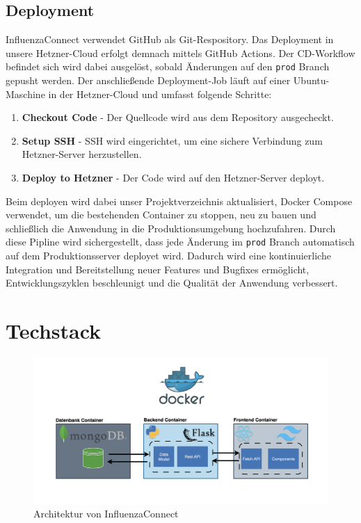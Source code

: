 \documentclass[conference,a4paper,flushend]{cs-techrep}
\begin{document}
\subsection{Deployment}
InfluenzaConnect verwendet GitHub als Git-Respository. Das Deployment in unsere Hetzner-Cloud erfolgt demnach mittels GitHub Actions. Der CD-Workflow befindet sich wird dabei ausgelöst, sobald Änderungen auf den \texttt{prod} Branch gepusht werden. Der anschließende Deployment-Job läuft auf einer Ubuntu-Maschine in der Hetzner-Cloud und umfasst folgende Schritte:
\begin{enumerate}
\item{\textbf{Checkout Code} - Der Quellcode wird aus dem Repository ausgecheckt.}
\item{\textbf{Setup SSH} - SSH wird eingerichtet, um eine sichere Verbindung zum Hetzner-Server
herzustellen.}
\item{\textbf{Deploy to Hetzner} - Der Code wird auf den Hetzner-Server deployt.}
\end{enumerate}
Beim deployen wird dabei unser Projektverzeichnis aktualisiert, Docker Compose verwendet, um die bestehenden Container zu stoppen, neu zu bauen und schließlich die Anwendung in die Produktionsumgebung hochzufahren.
Durch diese Pipline wird sichergestellt, dass jede Änderung im \texttt{prod} Branch automatisch auf dem Produktionsserver deployet wird. Dadurch wird eine kontinuierliche Integration und Bereitstellung neuer Features und Bugfixes ermöglicht, Entwicklungszyklen beschleunigt und die Qualität der Anwendung verbessert.


\section{Techstack}

\begin{figure}[h]
	\centering
	\includegraphics[width=\linewidth]{../Bilder/Architektur.png}
	\caption{Architektur von InfluenzaConnect}
	\label{fig:Architektur}
\end{figure}
\end{document}
